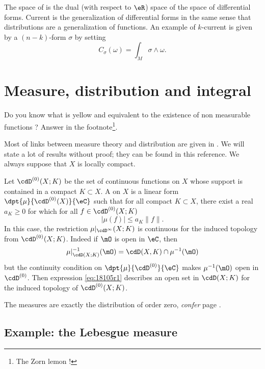 The space of  is the dual (with respect to $\eR$) space of the space of differential forms. Current is the generalization of differential forms in the same sense that distributions are a generalization of functions. An example of $k$-current is given by a $(n-k)$-form $\sigma$ by setting
\[ 
  C_{\sigma}(\omega)=\int_M \sigma\wedge\omega.
\]

\section{Measure, distribution and integral} \label{sec_distrib_mesure}

Do you know what is yellow and equivalent to the existence of non measurable functions ? Answer in the footnote\footnote{The Zorn lemon !}.

Most of links between measure theory and distribution are given in \cite{Dieu2}. We will state a lot of results without proof; they can be found in this reference. We always suppose that $X$ is locally compact. 

Let $\cdD^{(0)}(X;K)$ be the set of continuous functions on $X$ whose support is contained in a compact $K\subset X$. A  on $X$ is a linear form $\dpt{\mu}{\cdD^{(0)}(X)}{\eC}$ such that for all compact $K\subset X$, there exist a real $a_K\geq 0$ for which for all $f\in\cdD^{(0)}(X;K)$
\begin{equation}
  | \mu(f) |\leq a_K\| f \|.
\end{equation}
In this case, the restriction $\mu|_{\cdD^{\infty}}(X;K)$ is continuous for the induced topology from $\cdD^{(0)}(X;K)$. Indeed if $\mO$ is open in $\eC$, then
\begin{equation}  \label{eq:18105r1}
  \mu|_{\cdD(X;K)}^{-1}(\mO)=\cdD(X,K)\cap\mu^{-1}(\mO)
\end{equation}
but the continuity condition on $\dpt{\mu}{\cdD^{(0)}}{\eC}$ makes $\mu^{-1}(\mO)$ open in $\cdD^{(0)}$. Then expression \eqref{eq:18105r1} describes an open set in $\cdD(X;K)$ for the induced topology of $\cdD^{(0)}(X;K)$. 

The measures are exactly the distribution of order zero, \emph{confer} page \pageref{pg:reforder}.

\subsection{Example: the Lebesgue measure}

